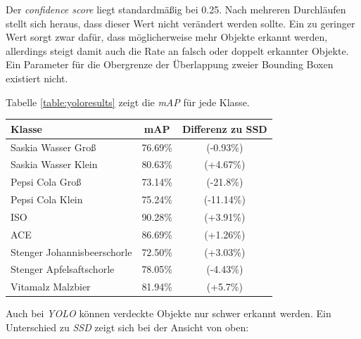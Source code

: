 Der \textit{confidence score} liegt standardmäßig bei 0.25. Nach mehreren Durchläufen stellt sich heraus, dass dieser Wert nicht verändert werden sollte. Ein zu geringer Wert sorgt zwar dafür, dass möglicherweise mehr Objekte erkannt werden, allerdings steigt damit auch die Rate an falsch oder doppelt erkannter Objekte. Ein Parameter für die Obergrenze der Überlappung zweier Bounding Boxen existiert nicht.

Tabelle \ref{table:yoloresults} zeigt die \textit{mAP} für jede Klasse.

\begin{center}
	\begin{tabular}[H]{l|c|c}
		Klasse & mAP & Differenz zu SSD\\
		\hline
		Saskia Wasser Groß & 76.69\% & (-0.93\%) \\
		Saskia Wasser Klein & 80.63\% & (+4.67\%) \\
		Pepsi Cola Groß & 73.14\% & (-21.8\%) \\
		Pepsi Cola Klein & 75.24\% & (-11.14\%) \\
		ISO & 90.28\% & (+3.91\%) \\
		ACE & 86.69\% & (+1.26\%) \\
		Stenger Johannisbeerschorle & 72.50\% & (+3.03\%) \\
		Stenger Apfelsaftschorle & 78.05\% & (-4.43\%) \\
		Vitamalz Malzbier & 81.94\% & (+5.7\%)
	\end{tabular}
	\label{table:yoloresults}
\end{center}

Auch bei \textit{YOLO} können verdeckte Objekte nur schwer erkannt werden. Ein Unterschied zu \textit{SSD} zeigt sich bei der Ansicht von oben:

